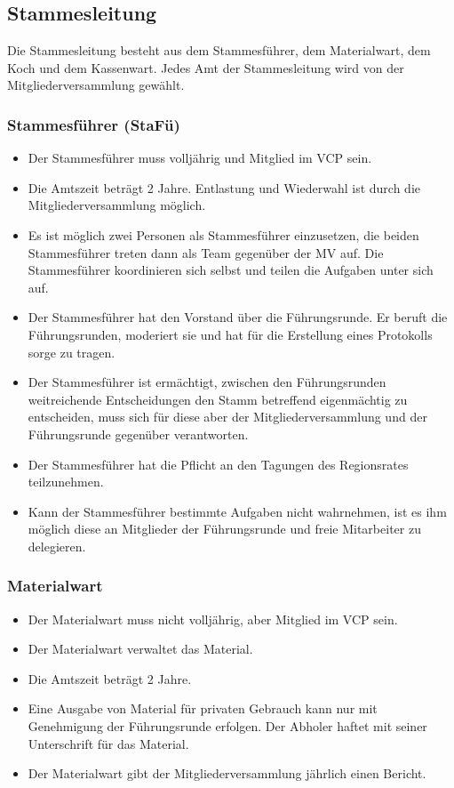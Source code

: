 \documentclass[a4paper]{article}
\begin{document}
    \subsection{Stammesleitung} %
    \label{sub:stammesleitung}
    Die Stammesleitung besteht aus dem Stammesführer, dem Materialwart, dem Koch und dem Kassenwart. Jedes Amt der Stammesleitung wird von der Mitgliederversammlung gewählt.
    \subsubsection{Stammesführer (StaFü)} %
    \label{ssub:stammesfuhrer_stafu}
	\begin{itemize}
		\item Der Stammesführer muss volljährig und Mitglied im VCP sein. 
		\item Die Amtszeit beträgt 2 Jahre. Entlastung und Wiederwahl ist durch die Mitgliederversammlung möglich. 
		\item Es ist möglich zwei Personen als Stammesführer einzusetzen, die beiden Stammesführer treten dann als Team gegenüber der MV auf. Die Stammesführer koordinieren sich selbst und teilen die Aufgaben unter sich auf. 
		\item Der Stammesführer hat den Vorstand über die Führungsrunde. Er beruft die Führungsrunden, moderiert sie und hat für die Erstellung eines Protokolls sorge zu tragen. 
		\item Der Stammesführer ist ermächtigt, zwischen den Führungsrunden weitreichende Entscheidungen den Stamm betreffend eigenmächtig zu entscheiden, muss sich für diese aber der Mitgliederversammlung und der Führungsrunde gegenüber verantworten. 
		\item Der Stammesführer hat die Pflicht an den Tagungen des Regionsrates teilzunehmen. 
		\item Kann der Stammesführer bestimmte Aufgaben nicht wahrnehmen, ist es ihm möglich diese an Mitglieder der Führungsrunde und freie Mitarbeiter zu delegieren. 
	\end{itemize}
    
    \subsubsection{Materialwart} %
    \label{ssub:materialwart}
	\begin{itemize}
		\item Der Materialwart muss nicht volljährig, aber Mitglied im VCP sein. 
		\item Der Materialwart verwaltet das Material. 
		\item Die Amtszeit beträgt 2 Jahre. 
		\item Eine Ausgabe von Material für privaten Gebrauch kann nur mit Genehmigung der Führungsrunde erfolgen. Der Abholer haftet mit seiner Unterschrift für das Material. 
		\item Der Materialwart gibt der Mitgliederversammlung jährlich einen Bericht. 
	\end{itemize}
    
\end{document}
